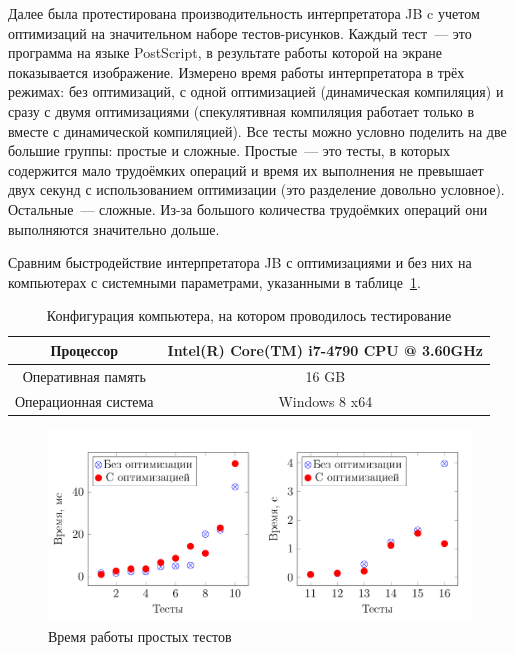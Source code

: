 	Далее была протестирована производительность интерпретатора JB c учетом оптимизаций на значительном наборе тестов-рисунков.	Каждый тест~--- это программа на языке PostScript, в результате работы которой на экране показывается изображение. Измерено время работы интерпретатора в трёх режимах: без оптимизаций, с одной оптимизацией (динамическая компиляция) и сразу с двумя оптимизациями (спекулятивная компиляция работает только в вместе с динамической компиляцией). Все тесты можно условно поделить на две большие группы: простые и сложные. Простые~--- это тесты, в которых содержится мало трудоёмких операций и время их выполнения не превышает двух секунд с использованием оптимизации (это разделение довольно условное). Остальные~--- сложные. Из-за большого количества трудоёмких операций они выполняются значительно дольше.
	
	Сравним быстродействие интерпретатора JB с оптимизациями и без них на компьютерах с системными параметрами, указанными в таблице~\ref{tab:config}.\\

	\begin{table}[t]
		\begin{center}
			\begin{tabular}{|c|c|}
				\hline Процессор & Intel(R) Core(TM) i7-4790 CPU @ 3.60GHz  \\
				\hline Оперативная память & 16 GB \\
				\hline Операционная система & Windows 8 x64 \\
				\hline 
			\end{tabular}
		\end{center}
		\caption{\label{tab:config}Конфигурация компьютера, на котором проводилось тестирование}
	\end{table}

		\begin{figure} [h]
			\includegraphics[width=\linewidth]{Pozdin/FastTests.png}
			\caption{Время работы простых тестов}\label{graphic: fast}
		\end{figure}

